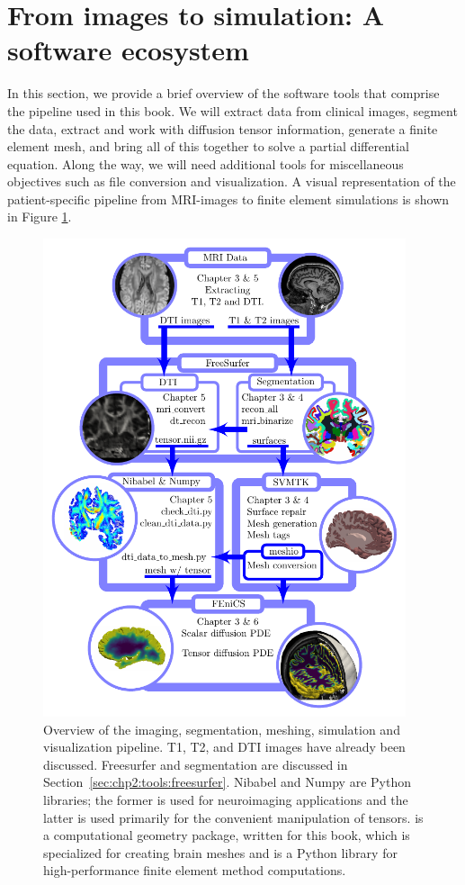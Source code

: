 \section{From images to simulation: A software ecosystem}
\label{sec:chp2:software-ecosystem}
In this section, we provide a brief overview of the software tools that 
comprise the pipeline used in this book. We will extract data from clinical
images, segment the data, extract and work with diffusion tensor
information, generate a finite element mesh, and bring all of this
together to solve a partial differential equation. Along
the way, we will need additional tools for miscellaneous
objectives such as file conversion and visualization. A visual
representation of the patient-specific pipeline from MRI-images to
finite element simulations is shown in Figure
\ref{fig:chp2:imaging-pipeine-overview}.

\begin{figure}
\centering
 \includegraphics[width=0.95\textwidth]{./graphics/chp2/pipeline-overview.pdf} 
  \caption{Overview of the imaging, segmentation, meshing, simulation and 
visualization pipeline. T1, T2, and DTI images have already been discussed.  
Freesurfer and segmentation are discussed in 
Section~\ref{sec:chp2:tools:freesurfer}. Nibabel and Numpy are Python libraries; 
the former is used for neuroimaging applications and the latter is used 
primarily for the convenient manipulation of tensors. {\svmtk} is a 
computational geometry package, written for this book, which is specialized for 
creating brain meshes and {\fenics} is a Python library for high-performance 
finite element method computations.}
  \label{fig:chp2:imaging-pipeine-overview}
\end{figure}

